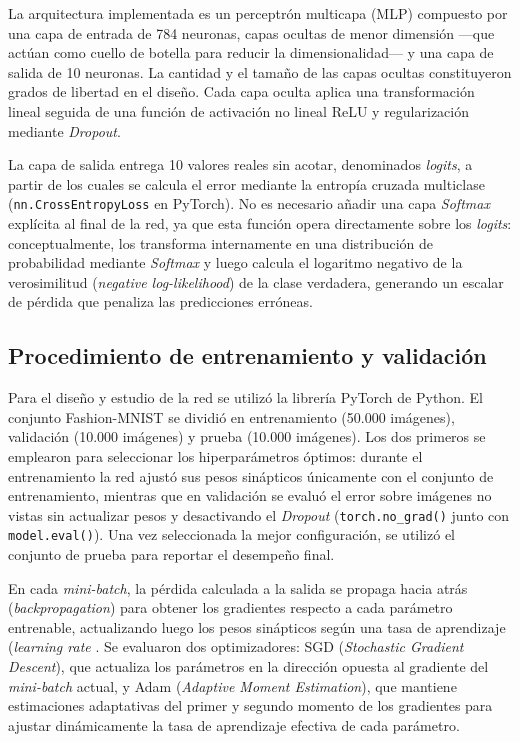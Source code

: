 \documentclass[aps,prl,twocolumn,superscriptaddress]{revtex4-2}
\begin{document}
La arquitectura implementada es un perceptrón multicapa (MLP) compuesto por una capa de entrada de 784 neuronas, capas ocultas de menor dimensión —que actúan como cuello de botella para reducir la dimensionalidad— y una capa de salida de 10 neuronas. La cantidad y el tamaño de las capas ocultas constituyeron grados de libertad en el diseño. Cada capa oculta aplica una transformación lineal seguida de una función de activación no lineal ReLU y regularización mediante \textit{Dropout}.

La capa de salida entrega 10 valores reales sin acotar, denominados \textit{logits}, a partir de los cuales se calcula el error mediante la entropía cruzada multiclase (\texttt{nn.CrossEntropyLoss} en PyTorch). No es necesario añadir una capa \textit{Softmax} explícita al final de la red, ya que esta función opera directamente sobre los \textit{logits}: conceptualmente, los transforma internamente en una distribución de probabilidad mediante \textit{Softmax} y luego calcula el logaritmo negativo de la verosimilitud (\textit{negative log-likelihood}) de la clase verdadera, generando un escalar de pérdida que penaliza las predicciones erróneas.

\subsection{Procedimiento de entrenamiento y validación}

Para el diseño y estudio de la red se utilizó la librería PyTorch de Python. El conjunto Fashion-MNIST se dividió en entrenamiento (50.000 imágenes), validación (10.000 imágenes) y prueba (10.000 imágenes). Los dos primeros se emplearon para seleccionar los hiperparámetros óptimos: durante el entrenamiento la red ajustó sus pesos sinápticos únicamente con el conjunto de entrenamiento, mientras que en validación se evaluó el error sobre imágenes no vistas sin actualizar pesos y desactivando el \textit{Dropout} (\texttt{torch.no\_grad()} junto con \texttt{model.eval()}). Una vez seleccionada la mejor configuración, se utilizó el conjunto de prueba para reportar el desempeño final.

En cada \textit{mini-batch}, la pérdida calculada a la salida se propaga hacia atrás (\textit{backpropagation}) para obtener los gradientes respecto a cada parámetro entrenable, actualizando luego los pesos sinápticos según una tasa de aprendizaje (\textit{learning rate} . Se evaluaron dos optimizadores: SGD (\textit{Stochastic Gradient Descent}), que actualiza los parámetros en la dirección opuesta al gradiente del \textit{mini-batch} actual, y Adam (\textit{Adaptive Moment Estimation}), que mantiene estimaciones adaptativas del primer y segundo momento de los gradientes para ajustar dinámicamente la tasa de aprendizaje efectiva de cada parámetro.
\end{document}
